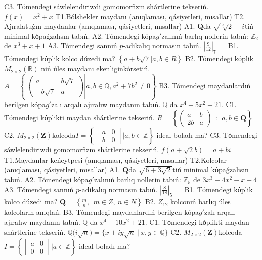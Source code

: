 C3. Tόmendegi sáwlelendiriwdi gomomorfizm shártlerine tekseriń. \(f(x) = x^{2} + x\)
T1.Bólshekler maydanı (anıqlaması, qásiyetleri, mısallar)
T2. Ajıralatuǵın maydanlar (anıqlaması, qásiyetleri, mısallar)
A1. \(\mathbf{Q}\)da \(\sqrt{\sqrt[3]{2} - i}\)tiń minimal kόpaǵzalısın tabıń.
A2. Tómendegi kópa\(g'\)zalınıń barlıq nollerin tabıń: \(\mathbb{Z}_{2}\) de \(x^{3} + x + 1\)
A3. Tómendegi sannıń \(p\)-adikalıq normasın tabıń. \(|\frac{9}{12}|_{7} =\)
B1. Tόmendegi kόplik kolco dúzedi ma? \(\left\{ a + b\sqrt{7}|a,b \in R \right\}\)
B2. Tόmendegi kόplik\(M_{2 \times 2}\left( \mathbb{R} \right)\) niń úles maydanı ekenliginkórsetiń. \(A = \left\{ \left. \ \begin{pmatrix}
a & b\sqrt{7} \\
 - b\sqrt{7} & a
\end{pmatrix} \right|a,b\mathbb{\in Q},a^{2} + 7b^{2} \neq 0 \right\}\)
B3. Tómendegi maydanlardıń berilgen kópa\(g'\)zalı arqalı ajıralıw maydanın tabıń.
\(\mathbb{Q}\) da \(x^{4} - 5x^{2} + 21\).
C1. Tόmendegi kόplikti maydan shártlerine tekseriń. \(R = \left\{ \begin{pmatrix}
a & b \\
2b & a
\end{pmatrix}\ \ :\ \ a,b \in \mathbf{Q} \right\}\)
C2. \(M_{2 \times 2}\left( \mathbf{Z} \right)\)kolcoda\(I = \left\{ \begin{bmatrix}
a & 0 \\
b & 0
\end{bmatrix}|a,b\mathbb{\in Z} \right\}\) ideal boladı ma?
C3. Tόmendegi sáwlelendiriwdi gomomorfizm shártlerine tekseriń. \(f\left( a + \sqrt{2}b \right) = a + bi\)
T1.Maydanlar keńeytpesi (anıqlaması, qásiyetleri, mısallar)
T2.Kolcolar (anıqlaması, qásiyetleri, mısallar)
A1. \(\mathbf{Q}\)da \(\sqrt{6 + 3\sqrt{2}}\)tiń minimal kόpaǵzalısın tabıń.
A2. Tómendegi kópa\(g'\)zalınıń barlıq nollerin tabıń: \(\mathbb{Z}_{5}\) de \(3x^{3} - 4x^{2} - x + 4\)
A3. Tómendegi sannıń \(p\)-adikalıq normasın tabıń. \(|\frac{8}{18}|_{5} =\)
B1. Tόmendegi kόplik kolco dúzedi ma? \(\mathbf{Q} = \left\{ \frac{m}{n},\ \ m \in Z,\ n \in N \right\}\)
B2. \(Z_{12}\) kolconıń barlıq úles kolcoların anıqlań.
B3. Tómendegi maydanlardıń berilgen kópa\(g'\)zalı arqalı ajıralıw maydanın tabıń. \(\mathbb{Q}\) da \(x^{4} - 10x^{2} + 21\).
C1. Tόmendegi kόplikti maydan shártlerine tekseriń. \(\mathbb{Q(}i\sqrt{n}) = \{ x + iy\sqrt{n}\ |\ x,y \in \mathbb{Q}\}\)
C2. \(M_{2 \times 2}\left( \mathbf{Z} \right)\)kolcoda\(I = \left\{ \begin{bmatrix}
a & 0 \\
0 & 0
\end{bmatrix}|a\mathbb{\in Z} \right\}\) ideal boladı ma?
